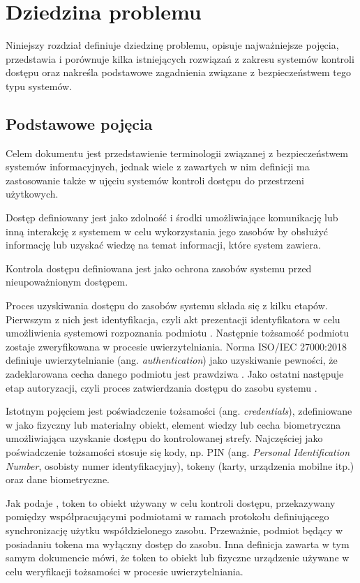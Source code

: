 \chapter{Dziedzina problemu}
\label{chap:problem-domain}

	Niniejszy rozdział definiuje dziedzinę problemu, opisuje najważniejsze pojęcia, przedstawia i porównuje kilka istniejących rozwiązań z zakresu systemów kontroli dostępu oraz nakreśla podstawowe zagadnienia związane z bezpieczeństwem tego typu systemów.

	\section{Podstawowe pojęcia}

		Celem dokumentu \cite{rfc4949} jest przedstawienie terminologii związanej z bezpieczeństwem systemów informacyjnych, jednak wiele z zawartych w nim definicji ma zastosowanie także w ujęciu systemów kontroli dostępu do przestrzeni użytkowych.

		Dostęp definiowany jest jako zdolność i środki umożliwiające komunikację lub inną interakcję z systemem w celu wykorzystania jego zasobów by obsłużyć informację lub uzyskać wiedzę na temat informacji, które system zawiera.

		Kontrola dostępu definiowana jest jako ochrona zasobów systemu przed nieupoważnionym dostępem.

		Proces uzyskiwania dostępu do zasobów systemu składa się z kilku etapów. Pierwszym z nich jest identyfikacja, czyli akt prezentacji identyfikatora w celu umożliwienia systemowi rozpoznania podmiotu \cite{rfc4949}. Następnie tożsamość podmiotu zostaje zweryfikowana w procesie uwierzytelniania. Norma ISO/IEC 27000:2018 definiuje uwierzytelnianie (ang. \textit{authentication}) jako uzyskiwanie pewności, że zadeklarowana cecha danego podmiotu jest prawdziwa \cite{iso27000}. Jako ostatni następuje etap autoryzacji, czyli proces zatwierdzania dostępu do zasobu systemu \cite{rfc4949}.

		Istotnym pojęciem jest poświadczenie tożsamości (ang. \textit{credentials}), zdefiniowane w \cite{bsia2016} jako fizyczny lub materialny obiekt, element wiedzy lub cecha biometryczna umożliwiająca uzyskanie dostępu do kontrolowanej strefy. Najczęściej jako poświadczenie tożsamości stosuje się kody, np. PIN (ang. \textit{Personal Identification Number}, osobisty numer identyfikacyjny), tokeny (karty, urządzenia mobilne itp.) oraz dane biometryczne.

		Jak podaje \cite{rfc4949}, token to obiekt używany w celu kontroli dostępu, przekazywany pomiędzy współpracującymi podmiotami w ramach protokołu definiującego synchronizację użytku współdzielonego zasobu. Przeważnie, podmiot będący w posiadaniu tokena ma wyłączny dostęp do zasobu. Inna definicja zawarta w tym samym dokumencie mówi, że token to obiekt lub fizyczne urządzenie używane w celu weryfikacji tożsamości w procesie uwierzytelniania.

